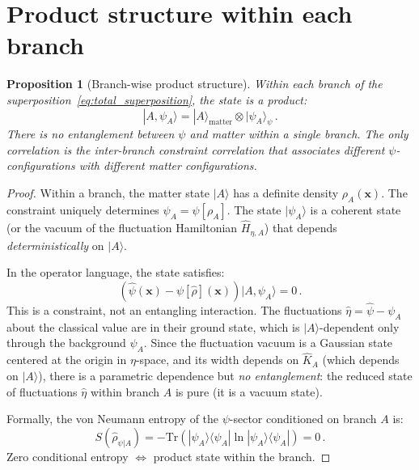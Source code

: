 \documentclass[12pt,a4paper]{article}
\newtheorem{proposition}[theorem]{Proposition}
\theoremstyle{definition}
\theoremstyle{remark}
\newcommand{\Tr}{\mathrm{Tr}}
\begin{document}
\section{Product structure within each branch}
\label{sec:product}

\begin{proposition}[Branch-wise product structure]
\label{prop:product}
Within each branch of the superposition~\eqref{eq:total_superposition},
the state is a product:
\begin{equation}
|A,\psi_A\rangle = |A\rangle_{\mathrm{matter}} \otimes |\psi_A\rangle_\psi\,.
\end{equation}
There is no entanglement between $\psi$ and matter \emph{within} a single branch.
The only correlation is the \emph{inter-branch} constraint correlation that
associates different $\psi$-configurations with different matter configurations.
\end{proposition}

\begin{proof}
Within a branch, the matter state $|A\rangle$ has a definite density
$\rho_A(\mathbf{x})$.  The constraint uniquely determines
$\psi_A = \psi[\rho_A]$.  The state $|\psi_A\rangle$ is a coherent state
(or the vacuum of the fluctuation Hamiltonian $\hat{H}_{\eta,A}$) that depends
\emph{deterministically} on $|A\rangle$.

In the operator language, the state satisfies:
\begin{equation}
\left(\hat{\psi}(\mathbf{x}) - \psi[\hat{\rho}](\mathbf{x})\right)|A,\psi_A\rangle = 0\,.
\end{equation}
This is a constraint, not an entangling interaction.  The fluctuations
$\hat{\eta} = \hat{\psi} - \psi_A$ about the classical value are in their
ground state, which is $|A\rangle$-dependent only through the background
$\psi_A$.  Since the fluctuation vacuum is a Gaussian state centered at the
origin in $\eta$-space, and its width depends on $\hat{K}_A$ (which depends
on $|A\rangle$), there is a parametric dependence but \emph{no entanglement}:
the reduced state of fluctuations $\hat{\eta}$ within branch $A$ is pure
(it is a vacuum state).

Formally, the von Neumann entropy of the $\psi$-sector conditioned on
branch $A$ is:
\begin{equation}
S(\hat{\rho}_{\psi|A}) = -\Tr(|\psi_A\rangle\langle\psi_A|\ln|\psi_A\rangle\langle\psi_A|) = 0\,.
\end{equation}
Zero conditional entropy $\Leftrightarrow$ product state within the branch.
\end{proof}
\end{document}
